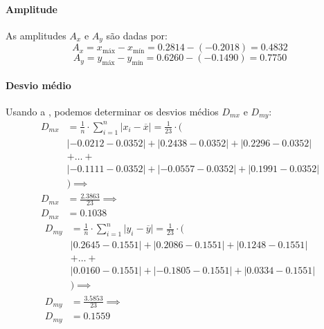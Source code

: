 \begin{resolucao}
\paragraph{Amplitude} As amplitudes $A_x$ e $A_y$ são dadas por:
\[
    A_x = x_{\textrm{máx}} - x_{\textrm{mín}} =
    0.2814 - (-0.2018) =
    0.4832
\]
\[
    A_y = y_{\textrm{máx}} - y_{\textrm{mín}} =
    0.6260 - (-0.1490) =
    0.7750
\]

\paragraph{Desvio médio} Usando a , podemos
determinar os desvios médios $D_{mx}$ e $D_{my}$:
\begin{align*}
    D_{mx} &=
        \frac{1}{n} \cdot \sum_{i=1}^{n} \lvert x_i - \overline{x} \rvert =
        \frac{1}{23} \cdot \Big( \\
    & \lvert -0.0212 - 0.0352 \rvert + \lvert 0.2438 - 0.0352 \rvert + \lvert 0.2296 - 0.0352 \rvert \\
    & + \ldots + \\
    & \lvert -0.1111 - 0.0352 \rvert + \lvert -0.0557 - 0.0352 \rvert + \lvert 0.1991 - 0.0352 \rvert \\
    & \Big) \implies \\
    D_{mx} &= \frac{2.3863}{23} \implies \\
    D_{mx} &= 0.1038
\end{align*}
\begin{align*}
    D_{my} &=
        \frac{1}{n} \cdot \sum_{i=1}^{n} \lvert y_i - \overline{y} \rvert =
        \frac{1}{23} \cdot \Big( \\
    & \lvert 0.2645 - 0.1551 \rvert + \lvert 0.2086 - 0.1551 \rvert + \lvert 0.1248 - 0.1551 \rvert \\
    & + \ldots + \\
    & \lvert 0.0160 - 0.1551 \rvert + \lvert -0.1805 - 0.1551 \rvert + \lvert 0.0334 - 0.1551 \rvert \\
    & \Big) \implies \\
    D_{my} &= \frac{3.5853}{23} \implies \\
    D_{my} &= 0.1559
\end{align*}


\end{resolucao}
